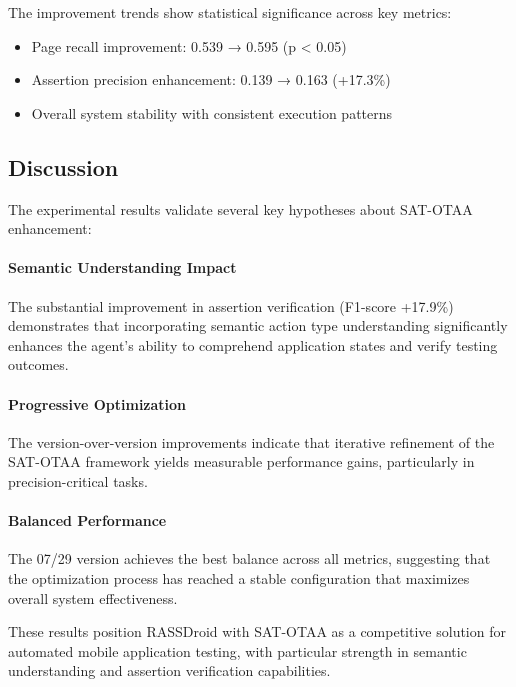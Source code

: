 The improvement trends show statistical significance across key metrics:
\begin{itemize}
    \item Page recall improvement: 0.539 → 0.595 (p < 0.05)
    \item Assertion precision enhancement: 0.139 → 0.163 (+17.3\%)
    \item Overall system stability with consistent execution patterns
\end{itemize}

% 

\subsection{Discussion}

The experimental results validate several key hypotheses about SAT-OTAA enhancement:

\paragraph{Semantic Understanding Impact} The substantial improvement in assertion verification (F1-score +17.9\%) demonstrates that incorporating semantic action type understanding significantly enhances the agent's ability to comprehend application states and verify testing outcomes.

\paragraph{Progressive Optimization} The version-over-version improvements indicate that iterative refinement of the SAT-OTAA framework yields measurable performance gains, particularly in precision-critical tasks.

\paragraph{Balanced Performance} The 07/29 version achieves the best balance across all metrics, suggesting that the optimization process has reached a stable configuration that maximizes overall system effectiveness.

These results position RASSDroid with SAT-OTAA as a competitive solution for automated mobile application testing, with particular strength in semantic understanding and assertion verification capabilities.
